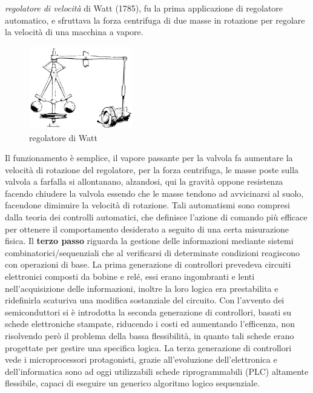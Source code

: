\documentclass[10pt, letterpaper]{report}
\begin{document}
\textit{regolatore di velocità} di Watt (1785), fu la prima applicazione di regolatore automatico, e sfruttava 
la forza centrifuga di due masse in rotazione per regolare la velocità di una macchina a vapore.
\begin{figure}[h!]
    \centering
    \includegraphics[width=0.4\textwidth ]{images/watt.pdf}
    \caption{regolatore di Watt}
    \label{fig:watt}
\end{figure} \acc
Il funzionamento è semplice, il vapore passante per la valvola fa aumentare la velocità di rotazione del 
regolatore, per la forza centrifuga, le masse poste sulla valvola a farfalla si allontanano, alzandosi, 
qui la gravità oppone resistenza facendo chiudere la valvola essendo che le masse tendono ad avvicinarsi al 
suolo, facendone diminuire la velocità di rotazione.  
Tali automatismi sono compresi dalla teoria dei controlli automatici, che definisce l'azione di comando più efficace 
per ottenere il comportamento desiderato a seguito di una certa misurazione fisica.\acc
Il \textbf{terzo passo} riguarda la gestione delle informazioni mediante sistemi combinatorici/sequenziali che al 
verificarsi di determinate condizioni reagiscono con operazioni di base. La prima generazione di controllori 
prevedeva circuiti elettronici composti da bobine e relé, essi erano ingombranti e lenti nell'acquisizione 
delle informazioni, inoltre la loro logica era prestabilita e ridefinirla scaturiva una modifica sostanziale 
del circuito. \acc 
Con l'avvento dei semiconduttori si è introdotta la seconda generazione di controllori, basati su schede 
elettroniche stampate, riducendo i costi ed aumentando l'efficenza, non risolvendo però il problema della bassa 
flessibilità, in quanto tali schede erano progettate per gestire una specifica logica. \acc 
La terza generazione di controllori vede i microprocessori protagonisti, grazie all'evoluzione dell'elettronica 
e dell'informatica sono ad oggi utilizzabili schede riprogrammabili (PLC) altamente flessibile, capaci di eseguire 
un generico algoritmo logico sequenziale.
\end{document}
